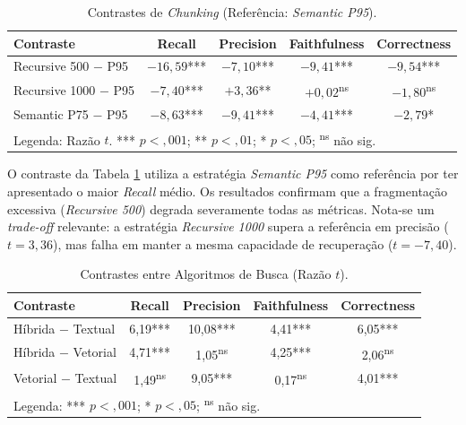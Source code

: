 \begin{table}[!ht]
  \centering
  \caption{Contrastes de \textit{Chunking} (Referência: \textit{Semantic P95}).}
  \label{tab:posthoc_chunking}
  \small
  \begin{tabular}{@{}lcccc@{}}
    \toprule
    \textbf{Contraste} & \textbf{Recall} & \textbf{Precision} & \textbf{Faithfulness} & \textbf{Correctness} \\ \midrule
    Recursive 500 $-$ P95  & $-16,59$*** & $-7,10$*** & $-9,41$*** & $-9,54$*** \\
    Recursive 1000 $-$ P95 & $-7,40$*** & $+3,36$** & $+0,02$\textsuperscript{ns} & $-1,80$\textsuperscript{ns} \\
    Semantic P75 $-$ P95   & $-8,63$*** & $-9,41$*** & $-4,41$*** & $-2,79$* \\ \bottomrule
    \multicolumn{5}{l}{\footnotesize Legenda: Razão $t$. *** $p < ,001$; ** $p < ,01$; * $p < ,05$; \textsuperscript{ns} não sig.}
  \end{tabular}
\end{table}

O contraste da Tabela \ref{tab:posthoc_chunking} utiliza a estratégia \textit{Semantic P95} como referência por ter apresentado o maior \textit{Recall} médio. Os resultados confirmam que a fragmentação excessiva (\textit{Recursive 500}) degrada severamente todas as métricas. Nota-se um \textit{trade-off} relevante: a estratégia \textit{Recursive 1000} supera a referência em precisão ($t = 3,36$), mas falha em manter a mesma capacidade de recuperação ($t = -7,40$).

\begin{table}[ht!]
  \centering
  \caption{Contrastes entre Algoritmos de Busca (Razão $t$).}
  \label{tab:posthoc_search}
  \small
  \begin{tabular}{@{}lcccc@{}}
    \toprule
    \textbf{Contraste} & \textbf{Recall} & \textbf{Precision} & \textbf{Faithfulness} & \textbf{Correctness} \\ \midrule
    Híbrida $-$ Textual  & 6,19*** & 10,08*** & 4,41*** & 6,05*** \\
    Híbrida $-$ Vetorial & 4,71*** & 1,05\textsuperscript{ns} & 4,25*** & 2,06\textsuperscript{ns} \\
    Vetorial $-$ Textual & 1,49\textsuperscript{ns} & 9,05*** & 0,17\textsuperscript{ns} & 4,01*** \\ \bottomrule
    \multicolumn{5}{l}{\footnotesize Legenda: *** $p < ,001$; * $p < ,05$; \textsuperscript{ns} não sig.}
  \end{tabular}
\end{table}


